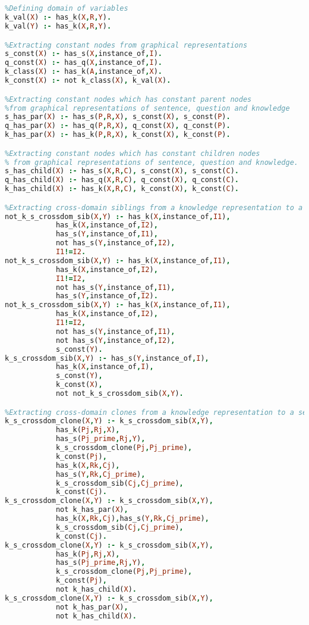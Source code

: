 \begin{lstlisting}[language=Prolog]


%Defining domain of variables
k_val(X) :- has_k(X,R,Y).
k_val(Y) :- has_k(X,R,Y).

%Extracting constant nodes from graphical representations
s_const(X) :- has_s(X,instance_of,I).
q_const(X) :- has_q(X,instance_of,I).
k_class(X) :- has_k(A,instance_of,X).
k_const(X) :- not k_class(X), k_val(X).

%Extracting constant nodes which has constant parent nodes
%from graphical representations of sentence, question and knowledge
s_has_par(X) :- has_s(P,R,X), s_const(X), s_const(P).
q_has_par(X) :- has_q(P,R,X), q_const(X), q_const(P).
k_has_par(X) :- has_k(P,R,X), k_const(X), k_const(P).

%Extracting constant nodes which has constant children nodes
% from graphical representations of sentence, question and knowledge.
s_has_child(X) :- has_s(X,R,C), s_const(X), s_const(C).
q_has_child(X) :- has_q(X,R,C), q_const(X), q_const(C).
k_has_child(X) :- has_k(X,R,C), k_const(X), k_const(C).

%Extracting cross-domain siblings from a knowledge representation to a sentence representation
not_k_s_crossdom_sib(X,Y) :- has_k(X,instance_of,I1),
			has_k(X,instance_of,I2),
			has_s(Y,instance_of,I1),
			not has_s(Y,instance_of,I2),
			I1!=I2.
not_k_s_crossdom_sib(X,Y) :- has_k(X,instance_of,I1),  
			has_k(X,instance_of,I2),
			I1!=I2,
			not has_s(Y,instance_of,I1),
			has_s(Y,instance_of,I2).
not_k_s_crossdom_sib(X,Y) :- has_k(X,instance_of,I1),
			has_k(X,instance_of,I2),
			I1!=I2,
			not has_s(Y,instance_of,I1),
			not has_s(Y,instance_of,I2),
			s_const(Y).
k_s_crossdom_sib(X,Y) :- has_s(Y,instance_of,I),
			has_k(X,instance_of,I),
			s_const(Y),
			k_const(X),
			not not_k_s_crossdom_sib(X,Y).

%Extracting cross-domain clones from a knowledge representation to a sentence representation
k_s_crossdom_clone(X,Y) :- k_s_crossdom_sib(X,Y),
			has_k(Pj,Rj,X),
			has_s(Pj_prime,Rj,Y),
			k_s_crossdom_clone(Pj,Pj_prime),
			k_const(Pj),
			has_k(X,Rk,Cj),
			has_s(Y,Rk,Cj_prime),
			k_s_crossdom_sib(Cj,Cj_prime),
			k_const(Cj).
k_s_crossdom_clone(X,Y) :- k_s_crossdom_sib(X,Y),
			not k_has_par(X),
			has_k(X,Rk,Cj),has_s(Y,Rk,Cj_prime),
			k_s_crossdom_sib(Cj,Cj_prime),
			k_const(Cj).
k_s_crossdom_clone(X,Y) :- k_s_crossdom_sib(X,Y),
			has_k(Pj,Rj,X),
			has_s(Pj_prime,Rj,Y),
			k_s_crossdom_clone(Pj,Pj_prime),
			k_const(Pj),
			not k_has_child(X).
k_s_crossdom_clone(X,Y) :- k_s_crossdom_sib(X,Y),
			not k_has_par(X),
			not k_has_child(X).


\end{lstlisting}

